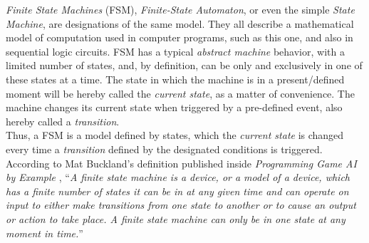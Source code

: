 	\emph{Finite State Machines} (FSM), \emph{Finite-State Automaton}, or even the simple \emph{State Machine},
	are designations of the same model. They all describe a mathematical model of computation used in computer 
	programs, such as this one, and also in sequential logic circuits. FSM has a typical \textit{abstract machine} behavior,
	with a limited number of states, and, by definition, can be only and exclusively in one of these states at a time. The 
	state in which the machine is in a present/defined moment will be hereby called the \emph{current state}, as a matter
	of convenience. The machine changes its current state when triggered by a pre-defined event, also hereby called a 
	\emph{transition}.\\

	Thus, a FSM is a model defined by states, which the \textit{current state} is changed every time a \textit{transition}
	defined by the designated conditions is triggered. According to Mat Buckland's definition published inside 
	\emph{Programming Game AI by Example} \cite{buckland2005}, 
	``\emph{A finite state machine is a device, or a model
		of a device, which has a finite number of states it can be in at any given time and can operate on	input to either 
		make transitions from one state to another or to cause an output or action to take place. A finite state machine can
		only be in one	state at any moment in time.}''\\[0.2cm]
